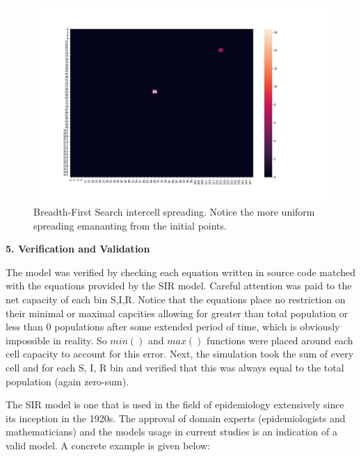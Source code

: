 \documentclass[a4paper]{article}
\begin{document}
\begin{figure}[ht]
  \includegraphics[scale=0.25]{../quarantine/quarantine_heatmap_3.png}
  \centering
  \caption{Breadth-First Search intercell spreading. Notice the more uniform
  spreading emananting from the initial points.}
\end{figure}

\begin{center}
  \textbf{5. Verification and Validation}
\end{center}

The model was verified by checking each equation written in source code matched
with the equations provided by the SIR model. Careful attention was paid to the
net capacity of each bin S,I,R. Notice that the equations place no restriction
on their minimal or maximal capcities allowing for greater than total population
or less than 0 populations after some extended period of time, which is
obviously impossible in reality. So $min()$ and $max()$ functions were placed
around each cell capacity to account for this error. Next,
the simulation took the sum of every cell and for each S, I, R bin and verified 
that this was always equal to the total population (again zero-sum).

The SIR model is one that is used in the field of epidemiology extensively since
its inception in the 1920s.
The approval of domain experts (epidemiologists and mathematicians) and the
models usage in current studies is an indication of a valid model. A concrete
example is given below: 
\end{document}
